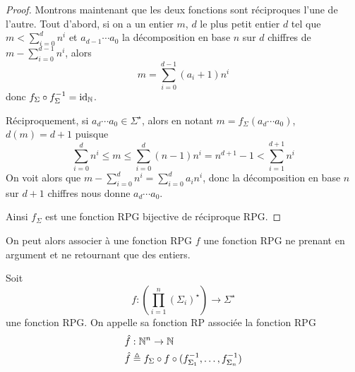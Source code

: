 \begin{proof}
  Montrons maintenant que les deux fonctions sont réciproques l'une de l'autre.
  Tout d'abord, si on a un entier $m$, $d$ le plus petit entier $d$ tel que
  $m < \sum_{i = 0}^d n^i$ et $a_{d-1}\cdots a_0$ la décomposition en base
  $n$ sur $d$ chiffres de $m - \sum_{i = 0}^{d-1}n^i$, alors
  \[m = \sum_{i=0}^{d-1} (a_i + 1)n^i\]
  donc $f_\Sigma\circ f_\Sigma^{-1} = \operatorname{id}_{\mathbb N}$.

  Réciproquement, si $a_d\cdots a_0\in \Sigma^\star$, alors en notant
  $m = f_\Sigma(a_d\cdots a_0)$, $d(m) = d + 1$ puisque
  \[\sum_{i = 0}^d n^i \leq m \leq \sum_{i = 0}^d (n-1)n^i = n^{d+1} - 1 <
  \sum_{i = 1}^{d+1} n^i\]
  On voit alors que $m - \sum_{i = 0}^d n^i = \sum_{i = 0}^d a_i n^i$, donc la
  décomposition en base $n$ sur $d+1$ chiffres nous donne $a_d\cdots a_0$.

  Ainsi $f_\Sigma$ est une fonction RPG bijective de réciproque RPG.
\end{proof}

On peut alors associer à une fonction RPG $f$ une fonction RPG ne prenant en
argument et ne retournant que des entiers.

\begin{definition}
  Soit
  \[f : \left(\prod_{i = 1}^n (\Sigma_i)^\star\right) \longrightarrow
  \Sigma^\star\]
  une fonction RPG. On appelle sa fonction RP associée la fonction RPG
  \begin{align*}
    \hat f &: \mathbb N^n \to \mathbb N\\
    \hat f &\triangleq f_\Sigma \circ f \circ
    (f_{\Sigma_1}^{-1},\ldots,f_{\Sigma_n}^{-1})
  \end{align*}
\end{definition}

